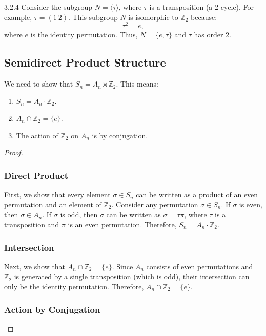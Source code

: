 \documentclass[12pt]{amsart}
\theoremstyle{definition}
\numberwithin{equation}{section}
\newcommand{\Z}{\mathbb{Z}}
\begin{document}
\begin{exercise}{3.2.4}
    Consider the subgroup \(N = \langle \tau \rangle\), where \(\tau\) is a transposition (a 2-cycle). For example, \(\tau = (1 \ 2)\). This subgroup \(N\) is isomorphic to \(\Z_2\) because:
    \[
    \tau^2 = e,
    \]
    where \(e\) is the identity permutation. Thus, \(N = \{e, \tau\}\) and \(\tau\) has order 2.

    \subsection*{Semidirect Product Structure}

    We need to show that \(S_n = A_n \rtimes \Z_2\). This means:
    \begin{enumerate}
        \item \(S_n = A_n \cdot \Z_2\).
        \item \(A_n \cap \Z_2 = \{e\}\).
        \item The action of \(\Z_2\) on \(A_n\) is by conjugation.
    \end{enumerate}

    \begin{proof} \( \)

    \subsubsection*{Direct Product}

    First, we show that every element \(\sigma \in S_n\) can be written as a product of an even permutation and an element of \(\Z_2\). Consider any permutation \(\sigma \in S_n\). If \(\sigma\) is even, then \(\sigma \in A_n\). If \(\sigma\) is odd, then \(\sigma\) can be written as \(\sigma = \tau \pi\), where \(\tau\) is a transposition and \(\pi\) is an even permutation. Therefore, \(S_n = A_n \cdot \Z_2\).

    \subsubsection*{Intersection}

    Next, we show that \(A_n \cap \Z_2 = \{e\}\). Since \(A_n\) consists of even permutations and \(\Z_2\) is generated by a single transposition (which is odd), their intersection can only be the identity permutation. Therefore, \(A_n \cap \Z_2 = \{e\}\).

    \subsubsection*{Action by Conjugation}


\end{proof}
\end{exercise}
\end{document}
